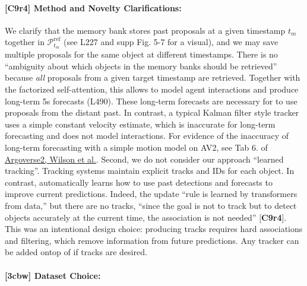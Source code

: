 \documentclass[10pt,twocolumn,letterpaper]{article}
\newcommand{\reviewerOne}{{\textcolor{TealBlue}{\textbf{C9r4}}}}
\newcommand{\reviewerTwo}{{\textcolor{Mulberry}{\textbf{3cbw}}}}
\begin{document}
\paragraph{[\reviewerOne{}] Method and Novelty Clarifications:}
We clarify that the memory bank stores past proposals
at a given timestamp $t_m$ together in $\mathcal{P}^{\mathrm{ref}}_{t_m}$ (see L227 and supp Fig. 5-7 for a visual), and we may
save multiple proposals for the same object at different timestamps.
There is no ``ambiguity about which objects in the memory banks should be retrieved'' because \emph{all} proposals from a given target timestamp are retrieved.
Together with the factorized self-attention, this allows \ourmodel{} to model agent interactions and produce long-term 5s forecasts (L490). These long-term forecasts are necessary for \ourmodel{} to use proposals from the distant past.
In contrast, a typical Kalman filter style tracker
uses a simple constant velocity estimate, which is inaccurate for long-term
forecasting and does not model interactions.
For evidence of the inaccuracy of long-term forecasting with a simple motion model on AV2, see Tab 6. of \href{https://arxiv.org/abs/2301.00493}{Argoverse2, Wilson et al.}. %
%
Second, we do not consider our approach ``learned tracking''. Tracking systems maintain explicit tracks and IDs for each
object. In contrast, \ourmodel{} automatically learns how to use past detections and forecasts to improve current predictions.
Indeed, the update ``rule is learned by transformers from data,'' but there are no tracks, ``since the goal is not to track but to detect objects accurately at the current time, the association is not needed'' [\reviewerOne{}].
This was an intentional design choice: producing tracks requires hard associations and filtering, which remove information from future predictions.
Any tracker can be added ontop of \ourmodel{} if tracks are desired.

\paragraph{[\reviewerTwo{}] Dataset Choice:}
\end{document}
